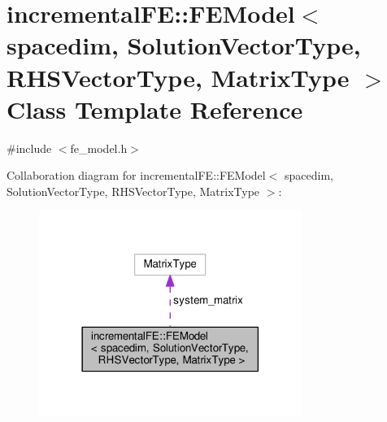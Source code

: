 \hypertarget{classincremental_f_e_1_1_f_e_model}{}\section{incremental\+FE\+:\+:F\+E\+Model$<$ spacedim, Solution\+Vector\+Type, R\+H\+S\+Vector\+Type, Matrix\+Type $>$ Class Template Reference}
\label{classincremental_f_e_1_1_f_e_model}


{\ttfamily \#include $<$fe\+\_\+model.\+h$>$}



Collaboration diagram for incremental\+FE\+:\+:F\+E\+Model$<$ spacedim, Solution\+Vector\+Type, R\+H\+S\+Vector\+Type, Matrix\+Type $>$\+:\nopagebreak
\begin{figure}[H]
\begin{center}
\leavevmode
\includegraphics[width=242pt]{classincremental_f_e_1_1_f_e_model__coll__graph}
\end{center}
\end{figure}
